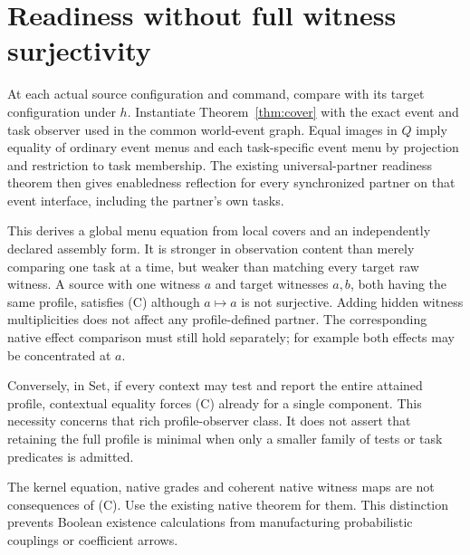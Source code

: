 \documentclass[11pt]{article}
\begin{document}
\section{Readiness without full witness surjectivity}
At each actual source configuration and command, compare with its target configuration under $h$. Instantiate Theorem~\ref{thm:cover} with the exact event and task observer used in the common world-event graph. Equal images in $Q$ imply equality of ordinary event menus and each task-specific event menu by projection and restriction to task membership. The existing universal-partner readiness theorem then gives enabledness reflection for every synchronized partner on that event interface, including the partner's own tasks.

This derives a global menu equation from local covers and an independently declared assembly form. It is stronger in observation content than merely comparing one task at a time, but weaker than matching every target raw witness. A source with one witness $a$ and target witnesses $a,b$, both having the same profile, satisfies (C) although $a\mapsto a$ is not surjective. Adding hidden witness multiplicities does not affect any profile-defined partner. The corresponding native effect comparison must still hold separately; for example both effects may be concentrated at $a$.

Conversely, in Set, if every context may test and report the entire attained profile, contextual equality forces (C) already for a single component. This necessity concerns that rich profile-observer class. It does not assert that retaining the full profile is minimal when only a smaller family of tests or task predicates is admitted.

The kernel equation, native grades and coherent native witness maps are not consequences of (C). Use the existing native theorem for them. This distinction prevents Boolean existence calculations from manufacturing probabilistic couplings or coefficient arrows.
\end{document}

